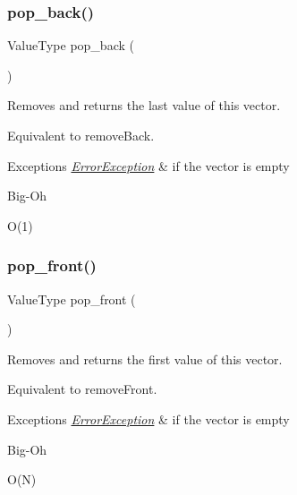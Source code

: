 \subsubsection{\texorpdfstring{pop\+\_\+back()}{pop\_back()}}
{\footnotesize\ttfamily Value\+Type pop\+\_\+back (\begin{DoxyParamCaption}{ }\end{DoxyParamCaption})}



Removes and returns the last value of this vector. 

Equivalent to remove\+Back. 
\begin{DoxyExceptions}{Exceptions}
{\em \mbox{\hyperlink{classErrorException}{Error\+Exception}}} & if the vector is empty \\
\hline
\end{DoxyExceptions}
\begin{DoxyRefDesc}{Big-\/\+Oh}
\item[\mbox{\hyperlink{BigOh__BigOh000120}{Big-\/\+Oh}}]O(1) \end{DoxyRefDesc}
\mbox{\label{classVector_aacdba74afa1be07d1046ece9e0512c77}} 
\subsubsection{\texorpdfstring{pop\+\_\+front()}{pop\_front()}}
{\footnotesize\ttfamily Value\+Type pop\+\_\+front (\begin{DoxyParamCaption}{ }\end{DoxyParamCaption})}



Removes and returns the first value of this vector. 

Equivalent to remove\+Front. 
\begin{DoxyExceptions}{Exceptions}
{\em \mbox{\hyperlink{classErrorException}{Error\+Exception}}} & if the vector is empty \\
\hline
\end{DoxyExceptions}
\begin{DoxyRefDesc}{Big-\/\+Oh}
\item[\mbox{\hyperlink{BigOh__BigOh000119}{Big-\/\+Oh}}]O(\+N) \end{DoxyRefDesc}
\mbox{\label{classVector_a8ff6f18ca45e769f2f8c7a0bcf79fad9}} 
